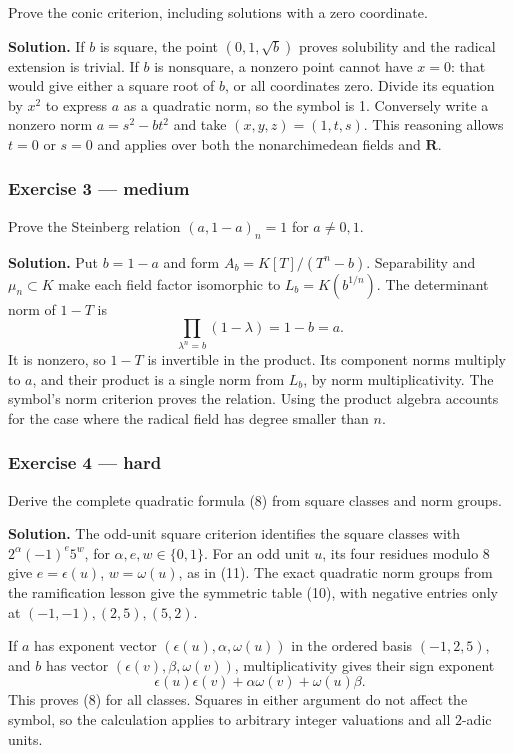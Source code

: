 \documentclass[11pt,a4paper]{article}
\begin{document}
Prove the conic criterion, including solutions with a zero coordinate.

\textbf{Solution.} If \(b\) is square, the point \((0,1,\sqrt b)\)
proves solubility and the radical extension is trivial. If \(b\) is
nonsquare, a nonzero point cannot have \(x=0\): that would give either a
square root of \(b\), or all coordinates zero. Divide its equation by
\(x^2\) to express \(a\) as a quadratic norm, so the symbol is 1.
Conversely write a nonzero norm \(a=s^2-bt^2\) and take
\((x,y,z)=(1,t,s)\). This reasoning allows \(t=0\) or \(s=0\) and
applies over both the nonarchimedean fields and \(\mathbf R\).

\subsubsection{Exercise 3 --- medium}\label{exercise-3-medium}

Prove the Steinberg relation \((a,1-a)_n=1\) for \(a\ne0,1\).

\textbf{Solution.} Put \(b=1-a\) and form \(A_b=K[T]/(T^n-b)\).
Separability and \(\mu_n\subset K\) make each field factor isomorphic to
\(L_b=K(b^{1/n})\). The determinant norm of \(1-T\) is \[
\prod_{\lambda^n=b}(1-\lambda)=1-b=a.
\] It is nonzero, so \(1-T\) is invertible in the product. Its component
norms multiply to \(a\), and their product is a single norm from
\(L_b\), by norm multiplicativity. The symbol's norm criterion proves
the relation. Using the product algebra accounts for the case where the
radical field has degree smaller than \(n\).

\subsubsection{Exercise 4 --- hard}\label{exercise-4-hard}

Derive the complete quadratic formula (8) from square classes and norm
groups.

\textbf{Solution.} The odd-unit square criterion identifies the square
classes with \(2^\alpha(-1)^e5^w\), for \(\alpha,e,w\in\{0,1\}\). For an
odd unit \(u\), its four residues modulo 8 give \(e=\epsilon(u)\),
\(w=\omega(u)\), as in (11). The exact quadratic norm groups from the
ramification lesson give the symmetric table (10), with negative entries
only at \((-1,-1),(2,5),(5,2)\).

If \(a\) has exponent vector \((\epsilon(u),\alpha,\omega(u))\) in the
ordered basis \((-1,2,5)\), and \(b\) has vector
\((\epsilon(v),\beta,\omega(v))\), multiplicativity gives their sign
exponent \[
\epsilon(u)\epsilon(v)+\alpha\omega(v)+\omega(u)\beta.
\] This proves (8) for all classes. Squares in either argument do not
affect the symbol, so the calculation applies to arbitrary integer
valuations and all \(2\)-adic units.
\end{document}

